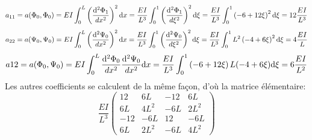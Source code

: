 \documentclass[a4paper]{article}
\def \de {{\rm d}}
\begin{document}
 \[a_{11}=a(\Phi_0,\Phi_0)=EI\int_0^L\left(\frac{\de^2 \Phi_1}{dx^2}\right)^2\de x=\frac{EI}{L^3}\int_0^1\left(\frac{\de^2 \Phi_1}{d\xi^2}\right)^2\de \xi=\frac{EI}{L^3}\int_0^1\left(-6+12\xi\right)^2\de \xi=12\frac{EI}{L^3}\]
\[a_{22}=a(\Psi_0,\Psi_0)=EI\int_0^L\left(\frac{\de^2 \Psi_0}{dx^2}\right)^2\de x=\frac{EI}{L^3}\int_0^1\left(\frac{\de^2 \Psi_0}{d\xi^2}\right)^2\de \xi=\frac{EI}{L^3}\int_0^1L^2\left(-4+6\xi\right)^2\de \xi=4\frac{EI}{L}\]
\[a12=a(\Phi_0,\Psi_0)=EI\int_0^L\frac{\de^2 \Phi_0}{dx^2}\frac{\de^2 \Psi_0}{dx^2}\de x=\frac{EI}{L^3}\int_0^1\left(-6+12\xi\right)L(-4+6\xi)\de \xi=6\frac{EI}{L^2}\]
Les autres coefficients se calculent de la même façon, d'où la matrice élémentaire:
\[\frac{EI}{L^3}\left(\begin{array}{rrrr} 
12&6L&-12&6L\\
6L&4L^2&-6L&2L^2\\
-12&-6L&12&-6L\\
6L&2L^2&-6L&4L^2
\end{array}\right) 
\]
\end{document}

